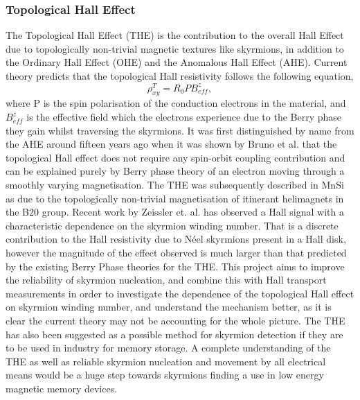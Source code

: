         \subsubsection{Topological Hall Effect}\label{subsubsec:THE}
        The Topological Hall Effect (THE) is the contribution to the overall Hall Effect due to topologically non-trivial magnetic textures like skyrmions\cite{Nagaosa2013}, in addition to the Ordinary Hall Effect (OHE) and the Anomalous Hall Effect (AHE).
        Current theory predicts that the topological Hall resistivity follows the following equation,
        \begin{equation}\label{eq:THE}
        	\rho_{xy}^{T} =  R_{0}PB_{eff}^{z},
        \end{equation}
        where P is the spin polarisation of the conduction electrons in the material, and $B_{eff}^{z}$ is the effective field which the electrons experience due to the Berry phase they gain whilst traversing the skyrmions\cite{Tanabe2017}. It was first distinguished by name from the AHE around fifteen years ago when it was shown by Bruno et al. that the topological Hall effect does not require any spin-orbit coupling contribution and can be explained purely by Berry phase theory of an electron moving through a smoothly varying magnetisation\cite{Bruno2004}. The THE was subsequently described in MnSi as due to the topologically non-trivial magnetisation of itinerant helimagnets in the B20 group\cite{Binz2008}. Recent work by Zeissler et. al. has observed a Hall signal with a characteristic dependence on the skyrmion winding number. That is a discrete contribution to the Hall resistivity due to N\'{e}el skyrmions present in a Hall disk, however the magnitude of the effect observed is much larger than that predicted by the existing Berry Phase theories for the THE\cite{Zeissler2018}. This project aims to improve the reliability of skyrmion nucleation, and combine this with Hall transport measurements in order to investigate the dependence of the topological Hall effect on skyrmion winding number, and understand the mechanism better, as it is clear the current theory may not be accounting for the whole picture. The THE has also been suggested as a possible method for skyrmion detection if they are to be used in industry for memory storage\cite{Hamamoto2016}. A complete understanding of the THE as well as reliable skyrmion nucleation and movement by all electrical means would be a huge step towards skyrmions finding a use in low energy magnetic memory devices.